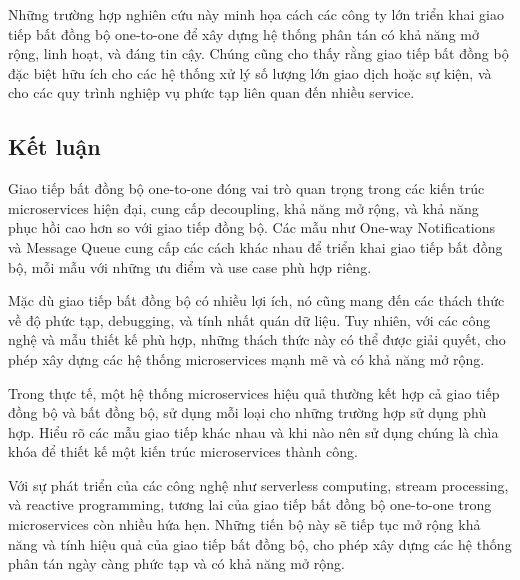 Những trường hợp nghiên cứu này minh họa cách các công ty lớn triển khai giao tiếp bất đồng bộ one-to-one để xây dựng hệ thống phân tán có khả năng mở rộng, linh hoạt, và đáng tin cậy. Chúng cũng cho thấy rằng giao tiếp bất đồng bộ đặc biệt hữu ích cho các hệ thống xử lý số lượng lớn giao dịch hoặc sự kiện, và cho các quy trình nghiệp vụ phức tạp liên quan đến nhiều service.

\subsection{Kết luận}
Giao tiếp bất đồng bộ one-to-one đóng vai trò quan trọng trong các kiến trúc microservices hiện đại, cung cấp decoupling, khả năng mở rộng, và khả năng phục hồi cao hơn so với giao tiếp đồng bộ. Các mẫu như One-way Notifications và Message Queue cung cấp các cách khác nhau để triển khai giao tiếp bất đồng bộ, mỗi mẫu với những ưu điểm và use case phù hợp riêng.

Mặc dù giao tiếp bất đồng bộ có nhiều lợi ích, nó cũng mang đến các thách thức về độ phức tạp, debugging, và tính nhất quán dữ liệu. Tuy nhiên, với các công nghệ và mẫu thiết kế phù hợp, những thách thức này có thể được giải quyết, cho phép xây dựng các hệ thống microservices mạnh mẽ và có khả năng mở rộng.

Trong thực tế, một hệ thống microservices hiệu quả thường kết hợp cả giao tiếp đồng bộ và bất đồng bộ, sử dụng mỗi loại cho những trường hợp sử dụng phù hợp. Hiểu rõ các mẫu giao tiếp khác nhau và khi nào nên sử dụng chúng là chìa khóa để thiết kế một kiến trúc microservices thành công.

Với sự phát triển của các công nghệ như serverless computing, stream processing, và reactive programming, tương lai của giao tiếp bất đồng bộ one-to-one trong microservices còn nhiều hứa hẹn. Những tiến bộ này sẽ tiếp tục mở rộng khả năng và tính hiệu quả của giao tiếp bất đồng bộ, cho phép xây dựng các hệ thống phân tán ngày càng phức tạp và có khả năng mở rộng.
